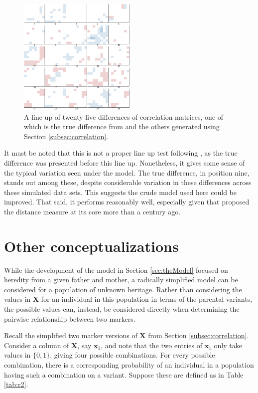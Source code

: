 \documentclass{article}
\newcommand{\ve}[1]{\mathbf{#1}}           %
\newcommand{\m}[1]{\mathbf{#1}}               %
\begin{document}
\begin{figure}[htp]
  \begin{center}
    \includegraphics[width = 0.5\textwidth]{./img/lineup.png}
  \end{center}
  \caption{A line up of twenty five differences of correlation matrices, one of which is the true difference from \cite{cheverudetal2001} and the others generated using Section \ref{subsec:correlation}.}
  \label{fig:lineup}
\end{figure}

It must be noted that this is not a proper line up test following \cite{bujaetal2009}, as the true difference was presented before this line up. Nonetheless, it gives some sense of the typical variation seen under the model. The true difference, in position nine, stands out among these, despite considerable variation in these differences across these simulated data sets. This suggests the crude model used here could be improved. That said, it performs reasonably well, especially given that \cite{haldane1919} proposed the distance measure at its core more than a century ago.

\section{Other conceptualizations} \label{sec:apply}

While the development of the model in Section \ref{sec:theModel} focused on heredity from a given father and mother, a radically simplified model can be considered for a population of unknown heritage. Rather than considering the values in $\m{X}$ for an individual in this population in terms of the parental variants, the possible values can, instead, be considered directly when determining the pairwise relationship between two markers.

Recall the simplified two marker versions of $\m{X}$ from Section \ref{subsec:correlation}. Consider a column of $\m{X}$, say $\ve{x}_1$, and note that the two entries of $\ve{x}_1$ only take values in $\{0,1\}$, giving four possible combinations. For every possible combination, there is a corresponding probability of an individual in a population having such a combination on a variant. Suppose these are defined as in Table \ref{tab:r2}.
\end{document}
